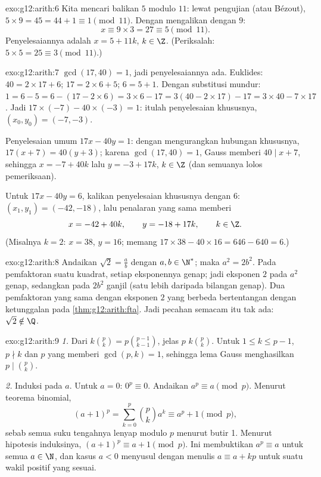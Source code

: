 \begin{solution}{exo:g12:arith:6}
Kita mencari balikan $5$ modulo $11$: lewat pengujian (atau Bézout),
$5 \times 9 = 45 = 44 + 1 \equiv 1 \pmod{11}$. Dengan mengalikan 
dengan $9$:
\[
x \equiv 9 \times 3 = 27 \equiv 5 \pmod{11}.
\]
Penyelesaiannya adalah  $x = 5 + 11k$, $k \in \Z$. (Periksalah:
$5\times5 = 25 \equiv 3 \pmod{11}$.)
\end{solution}

\begin{solution}{exo:g12:arith:7}
$\gcd(17, 40) = 1$, jadi penyelesaiannya ada. Euklides:
$40 = 2\times17 + 6$; $17 = 2\times6 + 5$; $6 = 5 + 1$. Dengan substitusi mundur:
$1 = 6 - 5 = 6 - (17 - 2\times6) = 3\times6 - 17
= 3(40 - 2\times17) - 17 = 3\times40 - 7\times17$. Jadi
$17\times(-7) - 40\times(-3) = 1$: itulah penyelesaian khususnya,
$(x_0, y_0) = (-7, -3)$.

Penyelesaian umum $17x - 40y = 1$: dengan mengurangkan hubungan khususnya,
$17(x + 7) = 40(y + 3)$; karena $\gcd(17, 40) = 1$, Gauss memberi
$40 \mid x + 7$, sehingga $x = -7 + 40k$ lalu $y = -3 + 17k$, $k \in \Z$
(dan semuanya lolos pemeriksaan).

Untuk $17x - 40y = 6$, kalikan penyelesaian khususnya dengan $6$:
$(x_1, y_1) = (-42, -18)$, lalu penalaran yang sama memberi
\[
x = -42 + 40k, \qquad y = -18 + 17k, \qquad k \in \Z .
\]
(Misalnya $k = 2$: $x = 38$, $y = 16$; memang $17\times38 - 40\times16
= 646 - 640 = 6$.)
\end{solution}

\begin{solution}{exo:g12:arith:8}
Andaikan $\sqrt2 = \frac ab$ dengan $a, b \in \N^*$; maka $a^2 = 2b^2$. Pada
pemfaktoran  suatu kuadrat, setiap eksponennya genap; jadi eksponen
$2$ pada $a^2$ genap, sedangkan pada $2b^2$ ganjil (satu lebih daripada bilangan
genap). Dua pemfaktoran  yang sama dengan eksponen $2$ yang berbeda
bertentangan dengan ketunggalan pada \cref{thm:g12:arith:fta}. Jadi pecahan
semacam itu tak ada: $\sqrt2 \notin \Q$.
\end{solution}

\begin{solution}{exo:g12:arith:9}
\emph{1.} Dari $k\binom pk = p \binom{p-1}{k-1}$, jelas $p$ 
$k\binom pk$. Untuk $1 \leq k \leq p-1$, $p \nmid k$ dan $p$ yang  memberi
$\gcd(p, k) = 1$, sehingga lema Gauss menghasilkan $p \mid \binom pk$.

\emph{2.} Induksi pada $a$. Untuk $a = 0$: $0^p \equiv 0$. Andaikan
$a^p \equiv a \pmod p$. Menurut teorema binomial,
\[
(a+1)^p = \sum_{k=0}^{p} \binom pk a^k
\equiv a^p + 1 \pmod p,
\]
sebab semua suku tengahnya lenyap modulo $p$ menurut butir 1. Menurut hipotesis
induksinya, $(a+1)^p \equiv a + 1 \pmod p$. Ini membuktikan
$a^p \equiv a$ untuk semua $a \in \N$, dan kasus $a < 0$ menyusul dengan menulis
$a \equiv a + kp$ untuk suatu wakil positif yang sesuai.
\end{solution}

